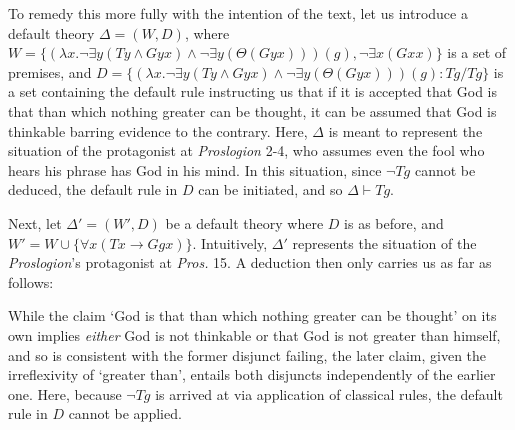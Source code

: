 \documentclass[]{birkjour}
\begin{document}
To remedy this more fully with the intention of the text, let us introduce a default theory $\Delta = (W, D)$, where $W = \{(\lambda x. \neg \exists y (Ty \wedge Gyx) \wedge \neg\exists y(\Theta(Gyx)))(g), \neg \exists x (Gxx)\}$ is a set of premises, and $D = \{(\lambda x. \neg \exists y (Ty \wedge Gyx) \wedge \neg\exists y(\Theta(Gyx)))(g) : Tg/Tg\}$ is a set containing the default rule instructing us that if it is accepted that God is that than which nothing greater can be thought, it can be assumed that God is thinkable barring evidence to the contrary. Here, $\Delta$ is meant to represent the situation of the protagonist at \textit{Proslogion} 2-4, who assumes even the fool who hears his phrase has God in his mind. In this situation, since $\neg Tg$ cannot be deduced, the default rule in $D$ can be initiated, and so $\Delta \vdash Tg$.
	
Next, let $\Delta' =(W', D)$ be a default theory where $D$ is as before, and $W' = W \cup \{\forall x (Tx \rightarrow Ggx)\}$. Intuitively, $\Delta'$ represents the situation of the \textit{Proslogion}'s protagonist at \textit{Pros.} 15. A deduction then only carries us as far as follows:
	
	
	
While the claim `God is that than which nothing greater can be thought' on its own implies \textit{either} God is not thinkable or that God is not greater than himself, and so is consistent with the former disjunct failing, the later claim, given the irreflexivity of `greater than', entails both disjuncts independently of the earlier one. Here, because $\neg Tg$ is arrived at via application of classical rules, the default rule in $D$ cannot be applied.
	
\end{document}
